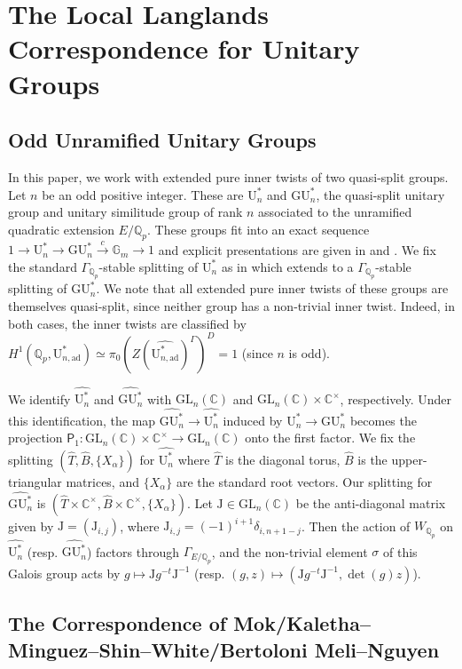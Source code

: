 \documentclass[reqno,11pt]{amsart}
\theoremstyle{remark}
\newcommand{\GU}{\mathrm{GU}}
\newcommand{\U}{\mathrm{U}}
\newcommand{\C}{\mathbb{C}}
\newcommand{\GL}{\mathrm{GL}}
\newcommand{\Gm}{{\mathbb{G}_m}}
\newcommand{\Q}{\mathbb{Q}}
\newcommand{\ad}{\mathrm{ad}}
\begin{document}
\section{The Local Langlands Correspondence for Unitary Groups}
\subsection{Odd Unramified Unitary Groups}{\label{ss: od unr unit groups}}
In this paper, we work with extended pure inner twists of two quasi-split groups. Let $n$ be an odd positive integer. These are $\U^*_n$ and $\GU^*_n$, the quasi-split unitary group and unitary similitude group of rank $n$ associated to the unramified quadratic extension $E/\Q_p$. These groups fit into an exact sequence $1 \to \U^*_n \to \GU^*_n \xrightarrow{c} \Gm \to 1$ and explicit presentations are given in \cite{KMSW} and \cite{BMN}. We fix the standard $\Gamma_{\Q_p}$-stable splitting of $\U^*_n$ as in \cite[pg 12]{KMSW} which extends to a $\Gamma_{\Q_p}$-stable splitting of $\GU^*_n$. We note that all extended pure inner twists of these groups are themselves quasi-split, since neither group has a non-trivial inner twist. Indeed, in both cases, the inner twists are classified by $H^1(\Q_p, \U^*_{n, \ad}) \simeq \pi_0(Z(\widehat{\U^*_{n,\ad}})^{\Gamma})^D = 1$ (since $n$ is odd).

We identify $\widehat{\U^*_n}$ and $\widehat{\GU^*_n}$ with $\GL_n(\C)$ and $\GL_n(\C) \times \C^{\times}$, respectively. Under this identification, the map $\widehat{\GU^*_n} \to \widehat{\U^*_n}$ induced by $\U^*_n \to \GU^*_n$ becomes the projection $\mathsf{P}_1 : \GL_n(\C) \times \C^{\times} \to \GL_n(\C)$ onto the first factor. We fix the splitting $(\widehat{T}, \widehat{B}, \{X_{\alpha}\})$ for $\widehat{\U^*_n}$ where $\widehat{T}$ is the diagonal torus, $\widehat{B}$ is the upper-triangular matrices, and $\{X_\alpha \}$ are the standard root vectors. Our splitting for $\widehat{\GU^*_n}$ is $(\widehat{T} \times \C^{\times}, \widehat{B} \times \C^{\times}, \{X_{\alpha}\})$.  Let $\mathrm{J} \in \GL_n(\C)$ be the anti-diagonal matrix given by $\mathrm{J}=(\mathrm{J}_{i,j})$, where $\mathrm{J}_{i,j} = (-1)^{i+1}\delta_{i, n+1 - j}$. Then the action of $W_{\Q_p}$ on $\widehat{\U^*_n}$ (resp. $\widehat{\GU^*_n}$) factors through $\Gamma_{E/\Q_p}$, and the non-trivial element $\sigma$ of this Galois group acts by $g \mapsto \mathrm{J}g^{-t}\mathrm{J}^{-1}$ (resp. $(g,z) \mapsto (\mathrm{J}g^{-t}\mathrm{J}^{-1}, \det(g)z )$).

\subsection{The Correspondence of Mok/Kaletha--Minguez--Shin--White/Bertoloni Meli--Nguyen}{\label{ss: classicalLLC}}
\end{document}
